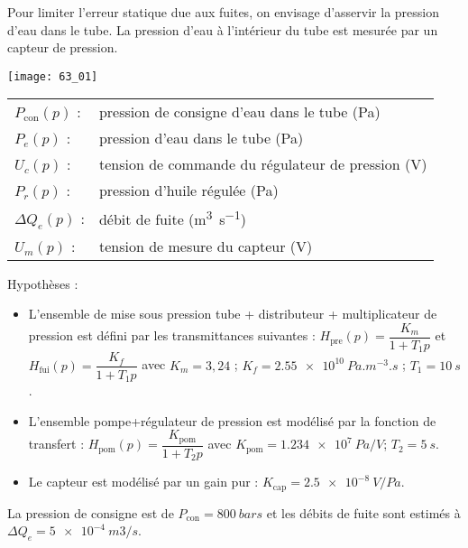 \normaltrue \difficilefalse \tdifficilefalse
\correctiontrue

\setcounter{question}{0}%

\ifcorrection
\else
{}
\fi

\ifprof
\else 

Pour limiter l’erreur statique due aux fuites, on envisage d’asservir la pression d’eau dans le tube. 
La pression d’eau à l’intérieur du tube est mesurée par un capteur de pression. 

\begin{marginfigure}
\texttt{[image: 63\_01]}
\end{marginfigure}

 
 \begin{tabular}{ll}
$P_{\text{con}}(p)$ : & 	pression de consigne d’eau dans le tube (Pa) \\
$P_e(p)$ : & 	pression d’eau dans le tube (Pa) \\
$U_c(p)$ : & 	tension de commande du régulateur de pression (V)\\
$P_r(p)$ : &	pression d’huile régulée (Pa)\\
$\Delta Q_e(p)$ :& 	débit de fuite (\si{m^3s^{-1}})\\
$U_m(p)$ 	:&	tension de mesure du capteur (V)\\
\end{tabular}
 
 Hypothèses :
\begin{itemize}
\item L’ensemble de mise sous pression {tube + distributeur + multiplicateur de pression} est défini par les transmittances suivantes : $H_{\text{pre}} (p)=\dfrac{K_m}{1+T_1 p}$	et	$H_{\text{fui}} (p)=\dfrac{K_f}{1+T_1 p}$ avec 	$K_m = 3,24$ ; 	$K_f = \SI{2,55e10}{Pa.m^{-3}.s}$ ; 	$T_1  = \SI{10}{s}$.
\item L’ensemble {pompe+régulateur de pression} est modélisé par la fonction de transfert :
$H_{\text{pom}} (p)=\dfrac{K_{\text{pom}}}{1+T_2 p}$  avec 	$K_{\text{pom}} = \SI{1,234e7}{Pa/V}$; 	$T_2 = \SI{5}{s}$.
\item Le capteur est modélisé par un gain pur :	$K_{\text{cap}} = \SI{2,5e-8}{V/Pa}$.
\end{itemize}
La pression de consigne est de $P_{\text{con}} = \SI{800}{bars}$ et les débits de fuite sont estimés à $\Delta Q_e = \SI{5e-4}{m3/s}$.


